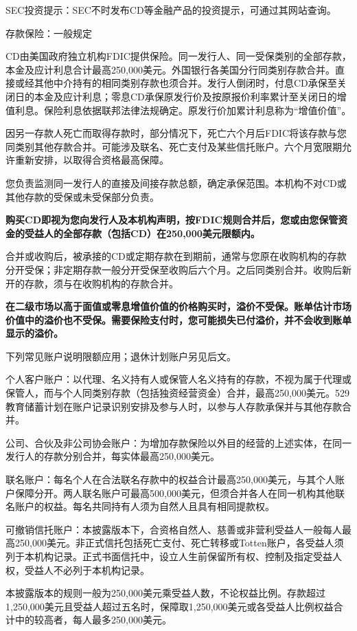 \documentclass[UTF8,fontset=none,11pt,a4paper]{ctexart}
\begin{document}
SEC投资提示：SEC不时发布CD等金融产品的投资提示，可通过其网站查询。


存款保险：一般规定


CD由美国政府独立机构FDIC提供保险。同一发行人、同一受保类别的全部存款，本金及应计利息合计最高250,000美元。外国银行各美国分行同类别存款合并。直接或经其他中介持有的相同类别存款也须合并。发行人倒闭时，付息CD承保至关闭日的本金及应计利息；零息CD承保原发行价及按原报价利率累计至关闭日的增值利息。保险利息依据联邦法律法规确定。原发行价加累计利息称为“增值价值”。


因另一存款人死亡而取得存款时，部分情况下，死亡六个月后FDIC将该存款与您同类别其他存款合并。可能涉及联名、死亡支付及某些信托账户。六个月宽限期允许重新安排，以取得合资格最高保障。


您负责监测同一发行人的直接及间接存款总额，确定承保范围。本机构不对CD或其他存款的受保或未受保部分负责。


\textbf{购买CD即视为您向发行人及本机构声明，按FDIC规则合并后，您或由您保管资金的受益人的全部存款（包括CD）在250,000美元限额内。}


合并或收购后，被承接的CD或定期存款在到期前，通常与您原在收购机构的存款分开受保；非定期存款一般分开受保至收购后六个月。之后同类别合并。收购后新开的存款，须与在收购机构的存款合并。


\textbf{在二级市场以高于面值或零息增值价值的价格购买时，溢价不受保。账单估计市场价值中的溢价也不受保。需要保险支付时，您可能损失已付溢价，并不会收到账单显示的溢价。}


下列常见账户说明限额应用；退休计划账户另见后文。


个人客户账户：以代理、名义持有人或保管人名义持有的存款，不视为属于代理或保管人，而与个人同类别存款（包括独资经营资金）合并，最高250,000美元。529教育储蓄计划在账户记录识别安排及参与人时，以参与人存款承保并与其他存款合并。


公司、合伙及非公司协会账户：为增加存款保险以外目的经营的上述实体，在同一发行人的存款分别合并，每实体最高250,000美元。


联名账户：每名个人在合法联名存款中的权益合计最高250,000美元，与其个人账户保障分开。两人联名账户可最高500,000美元，但须合并各人在同一机构其他联名账户的权益。每名共同持有人须为自然人且具有相同提款权。


可撤销信托账户：本披露版本下，合资格自然人、慈善或非营利受益人一般每人最高250,000美元。非正式信托包括死亡支付、死亡转移或Totten账户，各受益人须列于本机构记录。正式书面信托中，设立人生前保留所有权、控制及指定受益人权，受益人不必列于本机构记录。


本披露版本的规则一般为250,000美元乘受益人数，不论权益比例。存款超过1,250,000美元且受益人超过五名时，保障取1,250,000美元或各受益人比例权益合计中的较高者，每人最多250,000美元。
\end{document}
